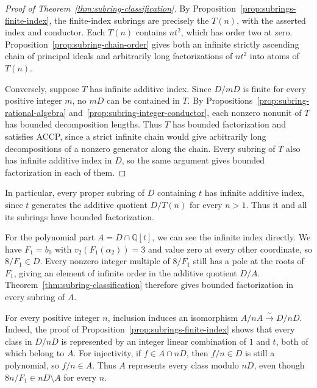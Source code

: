 \documentclass{article}
\theoremstyle{remark}
\begin{document}
\begin{proof}[Proof of Theorem~\ref{thm:subring-classification}]
    By Proposition~\ref{prop:subrings-finite-index}, the finite-index subrings are precisely the $T(n)$, with the asserted index and conductor.
    Each $T(n)$ contains $nt^2$, which has order two at zero.
    Proposition~\ref{prop:subring-chain-order} gives both an infinite strictly ascending chain of principal ideals and arbitrarily long factorizations of $nt^2$ into atoms of $T(n)$.

    Conversely, suppose $T$ has infinite additive index.
    Since $D/mD$ is finite for every positive integer $m$, no $mD$ can be contained in $T$.
    By Propositions~\ref{prop:subring-rational-algebra} and~\ref{prop:subring-integer-conductor}, each nonzero nonunit of $T$ has bounded decomposition lengths.
    Thus $T$ has bounded factorization and satisfies ACCP, since a strict infinite chain would give arbitrarily long decompositions of a nonzero generator along the chain.
    Every subring of $T$ also has infinite additive index in $D$, so the same argument gives bounded factorization in each of them.
\end{proof}

In particular, every proper subring of $D$ containing $t$ has infinite additive index, since $t$ generates the additive quotient $D/T(n)$ for every $n > 1$.
Thus it and all its subrings have bounded factorization.

For the polynomial part $A = D \cap \mathbb{Q}[t]$, we can see the infinite index directly.
We have $F_1 = b_0$ with $v_2(F_1(\alpha_2)) = 3$ and value zero at every other coordinate, so $8/F_1 \in D$.
Every nonzero integer multiple of $8/F_1$ still has a pole at the roots of $F_1$, giving an element of infinite order in the additive quotient $D/A$.
Theorem~\ref{thm:subring-classification} therefore gives bounded factorization in every subring of $A$.

For every positive integer $n$, inclusion induces an isomorphism $A/nA \xrightarrow{\sim} D/nD$.
Indeed, the proof of Proposition~\ref{prop:subrings-finite-index} shows that every class in $D/nD$ is represented by an integer linear combination of $1$ and $t$, both of which belong to $A$.
For injectivity, if $f \in A \cap nD$, then $f/n \in D$ is still a polynomial, so $f/n \in A$.
Thus $A$ represents every class modulo $nD$, even though $8n/F_1 \in nD \setminus A$ for every $n$.
\end{document}

